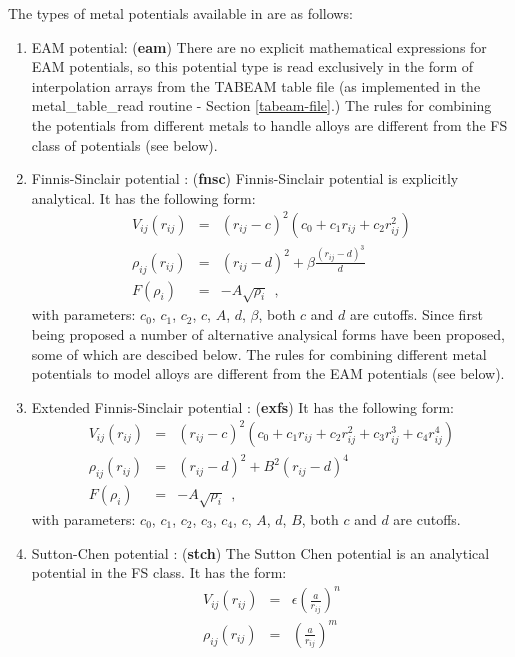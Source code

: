 The types of metal potentials available in \D are as follows:
\begin{enumerate}
\item EAM potential:  ({\bf eam})
There are no explicit mathematical expressions for EAM potentials, so
this potential type is read exclusively in the form of interpolation
arrays from the TABEAM table file (as implemented in the {\sc
metal\_table\_read} routine - Section \ref{tabeam-file}.)  The rules
for combining the potentials from different metals to handle alloys
are different from the FS class of potentials (see below).
\item Finnis-Sinclair potential \cite{finnis-84a}:  ({\bf fnsc})
Finnis-Sinclair potential is explicitly analytical.  It has the following form:
\begin{eqnarray}
V_{ij}(r_{ij}) &=& (r_{ij}-c)^{2} (c_{0}+c_{1}r_{ij}+c_{2}r_{ij}^{2}) \nonumber \\
\rho_{ij}(r_{ij}) &=& (r_{ij}-d)^{2} + \beta \frac{(r_{ij}-d)^{3}}{d} \\
F(\rho_{i}) &=& -A \sqrt{\rho_{i}}~~, \nonumber
\end{eqnarray}
with parameters: $c_{0}$, $c_{1}$, $c_{2}$, $c$, $A$, $d$, $\beta$,
both $c$ and $d$ are cutoffs.  Since first being proposed a number of
alternative analysical forms have been proposed, some of which are
descibed below.  The rules for combining different metal potentials to
model alloys are different from the EAM potentials (see below).
\item Extended Finnis-Sinclair potential \cite{dai-06}:  ({\bf exfs})
It has the following form:
\begin{eqnarray}
V_{ij}(r_{ij}) &=& (r_{ij}-c)^{2}
(c_{0}+c_{1}r_{ij}+c_{2}r_{ij}^{2}+c_{3}r_{ij}^{3}+c_{4}r_{ij}^{4}) \nonumber \\
\rho_{ij}(r_{ij}) &=& (r_{ij}-d)^{2} + B^{2} (r_{ij}-d)^{4} \\
F(\rho_{i}) &=& -A \sqrt{\rho_{i}}~~, \nonumber
\end{eqnarray}
with parameters: $c_{0}$, $c_{1}$, $c_{2}$, $c_{3}$, $c_{4}$, $c$, $A$, $d$, $B$,
both $c$ and $d$ are cutoffs.
\item Sutton-Chen potential \cite{sutton-90a,sutton-91a,todd-93a}:
({\bf stch})
The Sutton Chen potential is an analytical potential in the FS
class.  It has the form:
\begin{eqnarray}
V_{ij}(r_{ij}) &=& \epsilon \left( \frac{a}{r_{ij}} \right)^{n} \nonumber \\
\rho_{ij}(r_{ij}) &=& \left( \frac{a}{r_{ij}} \right)^{m} \\

\end{eqnarray}
\end{enumerate}
